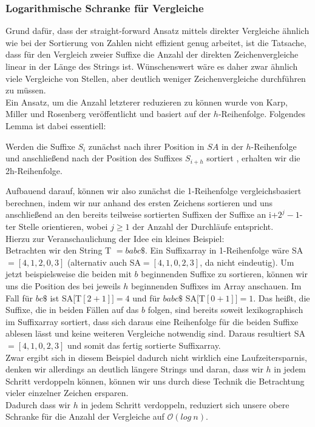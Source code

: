 \subsubsection{Logarithmische Schranke für Vergleiche}
Grund dafür, dass der straight-forward Ansatz mittels direkter Vergleiche ähnlich wie bei der Sortierung von Zahlen nicht effizient genug arbeitet, ist die Tatsache, dass für den Vergleich zweier Suffixe die Anzahl der direkten Zeichenvergleiche linear in der Länge des Strings ist. Wünschenswert wäre es daher zwar ähnlich viele Vergleiche von Stellen, aber deutlich weniger Zeichenvergleiche durchführen zu müssen.\\
Ein Ansatz, um die Anzahl letzterer reduzieren zu können wurde von Karp, Miller und Rosenberg \cite{Karp} veröffentlicht und basiert auf der $h$-Reihenfolge. Folgendes Lemma ist dabei essentiell:
\begin{lemma}
\label{manmyers}
Werden die Suffixe $S_i$ zunächst nach ihrer Position in $SA$ in der $h$-Reihenfolge und anschließend nach der Position des Suffixes $S_{i+h}$ sortiert , erhalten wir die 2h-Reihenfolge.
\end{lemma}
Aufbauend darauf, können wir also zunächst die 1-Reihenfolge vergleichsbasiert berechnen, indem wir nur anhand des ersten Zeichens sortieren und uns anschließend an den bereits teilweise sortierten Suffixen der Suffixe an i+$2^j-1$-ter Stelle orientieren, wobei $j \geq 1$ der Anzahl der Durchläufe entspricht.\\
Hierzu zur Veranschaulichung der Idee ein kleines Beispiel:\\
Betrachten wir den String T $=  babc\$ $. Ein Suffixarray in 1-Reihenfolge wäre SA$=[4,1,2,0,3]$ (alternativ auch SA$=[4,1,0,2,3]$, da nicht eindeutig). Um jetzt beispielsweise die beiden mit $ b $ beginnenden Suffixe zu sortieren, können wir uns die Position des bei jeweils $h$ beginnenden Suffixes im Array anschauen. Im Fall für $ bc\$ $  ist SA$[$T$[2+1]]=4$ und für $ babc\$ $ SA$[$T$[0+1]]=1$. Das heißt, die Suffixe, die in beiden Fällen auf das $ b $ folgen, sind bereits soweit lexikographisch im Suffixarray sortiert, dass sich daraus eine Reihenfolge für die beiden Suffixe ablesen lässt und keine weiteren Vergleiche notwendig sind. Daraus resultiert SA$=[4,1,0,2,3]$ und somit das fertig sortierte Suffixarray.\\
Zwar ergibt sich in diesem Beispiel dadurch nicht wirklich eine Laufzeitersparnis, denken wir allerdings an deutlich längere Strings und daran, dass wir $h$ in jedem Schritt verdoppeln können, können wir uns durch diese Technik die Betrachtung vieler einzelner Zeichen ersparen. \\
Dadurch dass wir $h$ in jedem Schritt verdoppeln, reduziert sich unsere obere Schranke für die Anzahl der Vergleiche auf $\mathcal{O}(log\ n)$.
